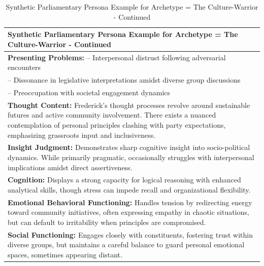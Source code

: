 \documentclass[11pt]{article}
\begin{document}
\begin{table}[ht]
\centering
\caption{Synthetic Parliamentary Persona Example for Archetype = The Culture-Warrior - Continued}
\label{tab:parliamentry-persona-example-6}
\scriptsize %
\begin{tabularx}{\textwidth}{X}
\toprule
\textbf{Synthetic Parliamentary Persona Example for Archetype = The Culture-Warrior - Continued} \\
\midrule
\textbf{Presenting Problems:}
– Interpersonal distrust following adversarial encounters \\
– Dissonance in legislative interpretations amidst diverse group discussions \\
– Preoccupation with societal engagement dynamics \\[4pt]

\textbf{Thought Content:} Frederick's thought processes revolve around sustainable futures and active community involvement. There exists a nuanced contemplation of personal principles clashing with party expectations, emphasizing grassroots input and inclusiveness. \\[4pt]

\textbf{Insight Judgment:} Demonstrates sharp cognitive insight into socio-political dynamics. While primarily pragmatic, occasionally struggles with interpersonal implications amidst direct assertiveness. \\[4pt]

\textbf{Cognition:} Displays a strong capacity for logical reasoning with enhanced analytical skills, though stress can impede recall and organizational flexibility. \\[4pt]

\textbf{Emotional Behavioral Functioning:} Handles tension by redirecting energy toward community initiatives, often expressing empathy in chaotic situations, but can default to irritability when principles are compromised. \\[4pt]

\textbf{Social Functioning:} Engages closely with constituents, fostering trust within diverse groups, but maintains a careful balance to guard personal emotional spaces, sometimes appearing distant. \\[4pt]


\end{tabularx}
\end{table}
\end{document}
